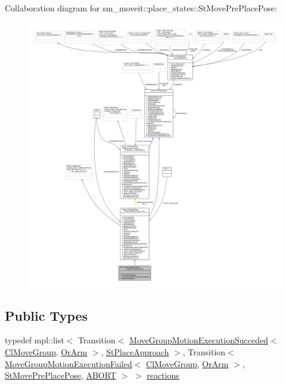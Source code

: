 Collaboration diagram for sm\+\_\+moveit\+:\+:place\+\_\+states\+:\+:St\+Move\+Pre\+Place\+Pose\+:
\nopagebreak
\begin{figure}[H]
\begin{center}
\leavevmode
\includegraphics[width=350pt]{structsm__moveit_1_1place__states_1_1StMovePrePlacePose__coll__graph}
\end{center}
\end{figure}
\subsection*{Public Types}
\begin{DoxyCompactItemize}
\item 
typedef mpl\+::list$<$ Transition$<$ \hyperlink{structmoveit__z__client_1_1MoveGroupMotionExecutionSucceded}{Move\+Group\+Motion\+Execution\+Succeded}$<$ \hyperlink{classmoveit__z__client_1_1ClMoveGroup}{Cl\+Move\+Group}, \hyperlink{classsm__moveit_1_1OrArm}{Or\+Arm} $>$, \hyperlink{structsm__moveit_1_1place__states_1_1StPlaceApproach}{St\+Place\+Approach} $>$, Transition$<$ \hyperlink{structmoveit__z__client_1_1MoveGroupMotionExecutionFailed}{Move\+Group\+Motion\+Execution\+Failed}$<$ \hyperlink{classmoveit__z__client_1_1ClMoveGroup}{Cl\+Move\+Group}, \hyperlink{classsm__moveit_1_1OrArm}{Or\+Arm} $>$, \hyperlink{structsm__moveit_1_1place__states_1_1StMovePrePlacePose}{St\+Move\+Pre\+Place\+Pose}, \hyperlink{classABORT}{A\+B\+O\+RT} $>$ $>$ \hyperlink{structsm__moveit_1_1place__states_1_1StMovePrePlacePose_aba9e304feab2249eac1087dd2e4f6719}{reactions}
\end{DoxyCompactItemize}
